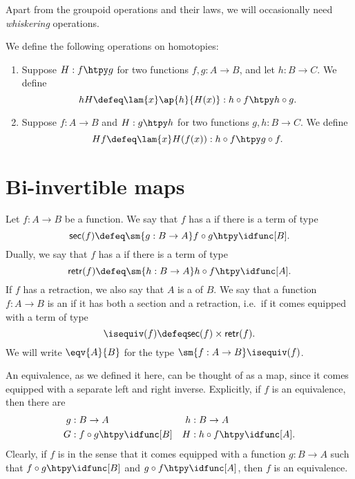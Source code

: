 Apart from the groupoid operations and their laws, we will occasionally need \emph{whiskering} operations.

\begin{defn}
We define the following  operations on homotopies:
\begin{enumerate}
\item Suppose $H:f\htpy g$ for two functions $f,g:A\to B$, and let $h:B\to C$. We define
\begin{equation*}
hH\defeq \lam{x}\ap{h}{H(x)}:h\circ f\htpy h\circ g.
\end{equation*}
\item Suppose $f:A\to B$ and $H:g\htpy h$ for two functions $g,h:B\to C$. We define
\begin{equation*}
Hf\defeq\lam{x}H(f(x)):h\circ f\htpy g\circ f.
\end{equation*}
\end{enumerate}
\end{defn}

\section{Bi-invertible maps}
\begin{defn}
Let $f:A\to B$ be a function. We say that $f$ has a  if there is a term of type
\begin{equation*}
\mathsf{sec}(f) \defeq \sm{g:B\to A} f\circ g\htpy \idfunc[B].
\end{equation*}
Dually, we say that $f$ has a  if there is a term of type
\begin{equation*}
\mathsf{retr}(f) \defeq \sm{h:B\to A} h\circ f\htpy \idfunc[A].
\end{equation*}
If $f$ has a retraction, we also say that $A$ is a  of $B$.
We say that a function $f:A\to B$ is an  if it has both a section and a retraction, i.e.~if it comes equipped with a term of type
\begin{equation*}
\isequiv(f)\defeq\mathsf{sec}(f)\times\mathsf{retr}(f).
\end{equation*}
We will write $\eqv{A}{B}$ for the type $\sm{f:A\to B}\isequiv(f)$.
\end{defn}

\begin{rmk}
An equivalence, as we defined it here, can be thought of as a  map, since it comes equipped with a separate left and right inverse. Explicitly, if $f$ is an equivalence, then there are
\begin{align*}
g & : B\to A & h & : B\to A \\
G & : f\circ g \htpy \idfunc[B] & H & : h\circ f \htpy \idfunc[A].
\end{align*}
Clearly, if $f$ is  in the sense that it comes equipped with a function $g:B\to A$ such that $f\circ g\htpy\idfunc[B]$ and $g\circ f\htpy\idfunc[A]$, then $f$ is an equivalence.
\end{rmk}

